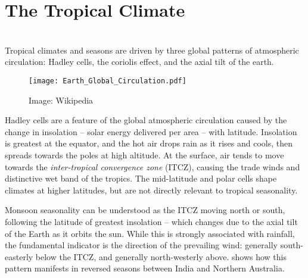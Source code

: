 \section{The Tropical Climate}
\label{sec:lit-tropical-climate}


\\



Tropical climates and seasons are driven by three global patterns of
atmospheric circulation:  Hadley cells, the coriolis effect, and the axial
tilt of the earth.

\begin{wrapfigure}{R}{0.6\textwidth}
    \centering
    \texttt{[image: Earth\_Global\_Circulation.pdf]}
    \caption[Hadley Cells and trade-winds]{
        Image: Wikipedia}
    \label{fig:hadley-cells}
\end{wrapfigure}

Hadley cells are a feature of the global atmospheric circulation
caused by the change in insolation -- solar energy delivered per area --
with latitude.  Insolation is greatest at the equator, and the hot air drops
rain as it rises and cools, then spreads towards the poles at high altitude.
At the surface, air tends to move towards the \textit{inter-tropical
convergence zone} (ITCZ), causing the trade winds and distinctive wet band
of the tropics.  The mid-latitude and polar cells shape climates at higher
latitudes, but are not directly relevant to tropical seasonality.

Monsoon seasonality can be understood as the ITCZ moving north or south,
following the latitude of greatest insolation -- which changes due to the
axial tilt of the Earth as it orbits the sun.  While this is strongly
associated with rainfall, the fundamental indicator is the direction of
the prevailing wind: generally south-easterly below the ITCZ, and generally
north-westerly above.   shows how this pattern
manifests in reversed seasons between India and Northern Australia.

